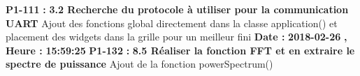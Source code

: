 \documentclass{article}%
\begin{document}
\newline%
%
\textbf{P1{-}111 }%
\textbf{ : }%
\textbf{ 3.2 Recherche du protocole à utiliser pour la communication UART}%
\newline%
\newline%
%
Ajout des fonctions global directement dans la classe application() et placement des widgets dans la grille pour un meilleur fini\newline%
\newline%
%
\textbf{Date : }%
\textbf{2018{-}02{-}26}%
\textbf{,}%
\textbf{ Heure : }%
\textbf{15:59:25}%
\newline%
%
\textbf{P1{-}132 }%
\textbf{ : }%
\textbf{ 8.5 Réaliser la fonction FFT et en extraire le spectre de puissance}%
\newline%
\newline%
%
Ajout de la fonction powerSpectrum()\newline%
\newline%
%
\newpage

%
\end{document}
